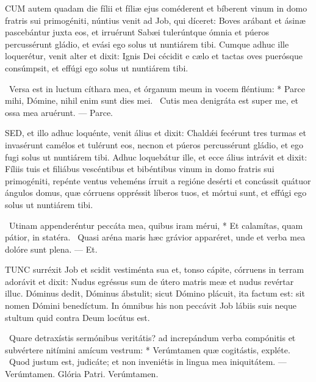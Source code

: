 

\lettrine[lines=2]{C}{UM} autem quadam die fílii et fíliæ ejus coméderent et bíberent vinum in domo fratris sui primogéniti, núntius venit ad Job, qui díceret: Boves arábant et ásinæ pascebántur juxta eos, et irruérunt Sabæi tulerúntque ómnia et púeros percussérunt gládio, et evási ego solus ut nuntiárem tibi. Cumque adhuc ille loquerétur, venit alter et dixit: Ignis Dei cécidit e cælo et tactas oves puerósque consúmpsit, et effúgi ego solus ut nuntiárem tibi.

\R\ Versa est in luctum cíthara mea, et órganum meum in vocem fléntium: * Parce mihi, Dómine, nihil enim sunt dies mei. \V\ Cutis mea denigráta est super me, et ossa mea aruérunt. — Parce.


\lettrine[lines=2]{S}{ED}, et illo adhuc loquénte, venit álius et dixit: Chaldǽi fecérunt tres turmas et invasérunt camélos et tulérunt eos, necnon et púeros percussérunt gládio, et ego fugi solus ut nuntiárem tibi. Adhuc loquebátur ille, et ecce álius intrávit et dixit: Fíliis tuis et filiábus vescéntibus et bibéntibus vinum in domo fratris sui primogéniti, repénte ventus veheméns írruit a regióne desérti et concússit quátuor ángulos domus, quæ córruens oppréssit líberos tuos, et mórtui sunt, et effúgi ego solus ut nuntiárem tibi.

\R\ Utinam appenderéntur peccáta mea, quibus iram mérui, * Et calamítas, quam pátior, in statéra. \V\ Quasi aréna maris hæc grávior apparéret, unde et verba mea dolóre sunt plena. — Et.



\lettrine[lines=2]{T}{UNC} surréxit Job et scidit vestiménta sua et, tonso cápite, córruens in terram adorávit et dixit: Nudus egréssus sum de útero matris meæ et nudus revértar illuc. Dóminus dedit, Dóminus ábstulit; sicut Dómino plácuit, ita factum est: sit nomen Dómini benedíctum. In ómnibus his non peccávit Job lábiis suis neque stultum quid contra Deum locútus est.

\R\ Quare detraxístis sermónibus veritátis? ad increpándum verba compónitis et subvértere nitímini amícum vestrum: * Verúmtamen quæ cogitástis, expléte. \V\ Quod justum est, judicáte; et non inveniétis in lingua mea iniquitátem. — Verúmtamen. Glória Patri. Verúmtamen.

